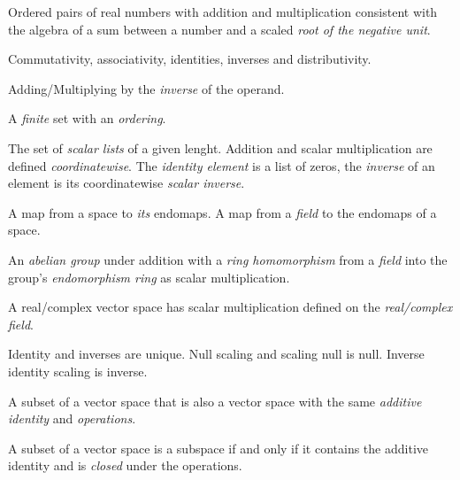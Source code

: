 \pagebreak


\begin{multicols}{3}

  Ordered pairs of real numbers with addition and multiplication consistent with
  the algebra of a sum between a number and a scaled \textit{root of the negative unit}.

  Commutativity, associativity, identities, inverses and distributivity.

  Adding/Multiplying by the \textit{inverse} of the operand.

  A \textit{finite} set with an \textit{ordering}.

  The set of \textit{scalar lists} of a given lenght.
  Addition and scalar multiplication are defined \textit{coordinatewise}.
  The \textit{identity element} is a list of zeros, the \textit{inverse}
  of an element is its coordinatewise \textit{scalar inverse}.

  A map from a space to \textit{its} endomaps.
  A map from a \textit{field} to the endomaps of a space.

  An \textit{abelian group} under addition with a \textit{ring homomorphism} from a \textit{field} into the group's \textit{endomorphism ring} as scalar multiplication.

  A real/complex vector space has scalar multiplication defined on the \textit{real/complex field}.

  Identity and inverses are unique. Null scaling and scaling null is null. Inverse identity scaling is inverse.

  A subset of a vector space that is also a vector space with the same \textit{additive identity} and \textit{operations}.

  A subset of a vector space is a subspace if and only if it contains the additive identity and is \textit{closed} under the operations.


\end{multicols}
